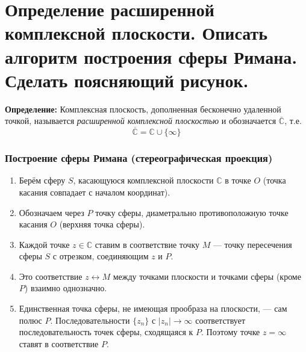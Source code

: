 \section{Определение расширенной комплексной плоскости. Описать алгоритм
построения сферы Римана. Сделать поясняющий
рисунок.}\label{ux43eux43fux440ux435ux434ux435ux43bux435ux43dux438ux435-ux440ux430ux441ux448ux438ux440ux435ux43dux43dux43eux439-ux43aux43eux43cux43fux43bux435ux43aux441ux43dux43eux439-ux43fux43bux43eux441ux43aux43eux441ux442ux438.-ux43eux43fux438ux441ux430ux442ux44c-ux430ux43bux433ux43eux440ux438ux442ux43c-ux43fux43eux441ux442ux440ux43eux435ux43dux438ux44f-ux441ux444ux435ux440ux44b-ux440ux438ux43cux430ux43dux430.-ux441ux434ux435ux43bux430ux442ux44c-ux43fux43eux44fux441ux43dux44fux44eux449ux438ux439-ux440ux438ux441ux443ux43dux43eux43a.}

\textbf{Определение:} Комплексная плоскость, дополненная бесконечно
удаленной точкой, называется \emph{расширенной комплексной плоскостью} и
обозначается \(\overline{\mathbb{C}}\), т.е. \[
\overline{\mathbb{C}}=\mathbb{C}\cup \{ \infty \}
\]

\subsubsection{Построение сферы Римана (стереографическая
проекция)}\label{ux43fux43eux441ux442ux440ux43eux435ux43dux438ux435-ux441ux444ux435ux440ux44b-ux440ux438ux43cux430ux43dux430-ux441ux442ux435ux440ux435ux43eux433ux440ux430ux444ux438ux447ux435ux441ux43aux430ux44f-ux43fux440ux43eux435ux43aux446ux438ux44f}

\begin{enumerate}
\def\labelenumi{\arabic{enumi}.}
\tightlist
\item
  Берём сферу \(S\), касающуюся комплексной плоскости \(\mathbb{C}\) в
  точке \(O\) (точка касания совпадает с началом координат).
\item
  Обозначаем через \(P\) точку сферы, диаметрально противоположную точке
  касания \(O\) (верхняя точка сферы).
\item
  Каждой точке \(z \in \mathbb{C}\) ставим в соответствие точку \(M\)
  --- точку пересечения сферы \(S\) с отрезком, соединяющим \(z\) и
  \(P\).
\item
  Это соответствие \(z \leftrightarrow M\) между точками плоскости и
  точками сферы (кроме \(P\)) взаимно однозначно.
\item
  Единственная точка сферы, не имеющая прообраза на плоскости, --- сам
  полюс \(P\). Последовательности \(\{z_n\}\) с \(|z_n| \to \infty\)
  соответствует последовательность точек сферы, сходящаяся к \(P\).
  Поэтому точке \(z = \infty\) ставят в соответствие \(P\).
\end{enumerate}

